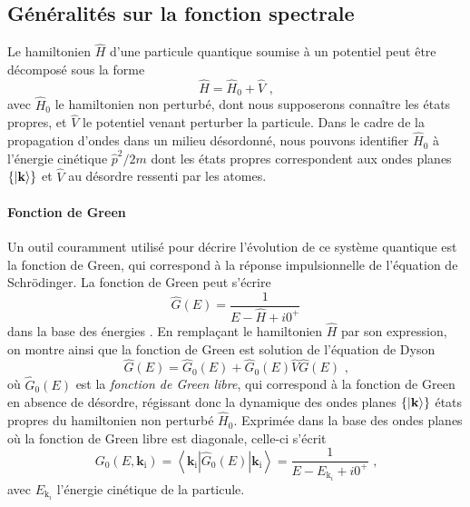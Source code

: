 \subsection{Généralités sur la fonction spectrale}
Le hamiltonien $\hat{H}$ d'une particule quantique soumise à un potentiel peut être décomposé sous la forme
\begin{equation}
\hat{H}=\hat{H}_0+\hat{V} \text{ ,}
\end{equation}
avec $\hat{H}_0$ le hamiltonien non perturbé, dont nous supposerons connaître les états propres, et $\hat{V}$ le potentiel venant perturber la particule. Dans le cadre de la propagation d'ondes dans un milieu désordonné, nous pouvons identifier $\hat{H}_0$ à l'énergie cinétique $\hat{p}^2/2m$ dont les états propres correspondent aux ondes planes $\lbrace \left| \mathbf{k} \right\rangle \rbrace$ et $\hat{V}$ au désordre ressenti par les atomes.

\paragraph*{Fonction de Green}
Un outil couramment utilisé pour décrire l'évolution de ce système quantique est la fonction de Green, qui correspond à la réponse impulsionnelle de l'équation de Schrödinger. La fonction de Green peut s'écrire
\begin{equation}
\hat{G}(E)=\frac{1}{E-\hat{H}+i 0^+} 
\label{eq:definition_green}
\end{equation}
dans la base des énergies \citep{akkermans2007mesoscopic}\citep{kuhn2007coherent}. En remplaçant le hamiltonien $\hat{H}$ par son expression, on montre ainsi que la fonction de Green est solution de l'équation de Dyson
\begin{equation}
\hat{G}(E)=\hat{G}_0(E) + \hat{G}_0(E) \hat{V} \hat{G}(E) \text{ ,}
\label{eq:dyson}
\end{equation}
où $\hat{G}_0(E)$ est la \emph{fonction de Green libre}, qui correspond à la fonction de Green en absence de désordre, régissant donc la dynamique des ondes planes $\lbrace\left| \mathbf{k} \right\rangle\rbrace$ états propres du hamiltonien non perturbé $\hat{H}_0$. Exprimée dans la base des ondes planes où la fonction de Green libre est diagonale, celle-ci s'écrit 
\begin{equation}
G_0(E,\mathbf{k}_{\mathrm{i}})=\left\langle\mathbf{k}_{\mathrm{i}} | \hat{G}_0(E)| \mathbf{k}_{\mathrm{i}} \right\rangle =\frac{1}{E-E_{\mathrm{k}_i}+i0^+} \text{ ,}
\end{equation}
avec $E_{\mathrm{k}_i}$ l'énergie cinétique de la particule. 


